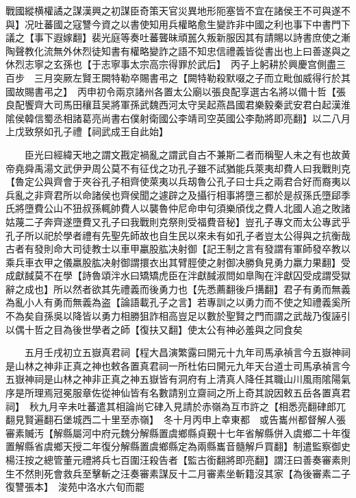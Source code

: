戰國縱横權譎之謀漢興之初謀臣奇策天官災異地形阨塞皆不宜在諸侯王不可與遂不與】况吐蕃國之寇讐今資之以書使知用兵權略愈生變詐非中國之利也事下中書門下議之【事下遐嫁翻】裴光庭等奏吐蕃聾昧頑嚚久叛新服因其有請賜以詩書庶使之漸陶聲教化流無外休烈徒知書有權略變詐之語不知忠信禮義皆從書出也上曰善遂與之休烈志寧之玄孫也【于志寧事太宗高宗得罪於武后】　丙子上躬耕於興慶宫側盡三百步　三月突厥左賢王闕特勒卒賜書弔之【闕特勒殺默啜之子而立毗伽威得行於其國故賜書弔之】　丙申初令兩京諸州各置太公廟以張良配享選古名將以備十哲【張良配饗齊大司馬田穰苴吴將軍孫武魏西河太守吴起燕昌國君樂毅秦武安君白起漢淮隂侯韓信蜀丞相諸葛亮尚書右僕射衛國公李靖司空英國公李勣將即亮翻】以二八月上戊致祭如孔子禮【祠武成王自此始】

　　臣光曰經緯天地之謂文戡定禍亂之謂武自古不兼斯二者而稱聖人未之有也故黄帝堯舜禹湯文武伊尹周公莫不有征伐之功孔子雖不試猶能兵萊夷却費人曰我戰則克【魯定公與齊會于夾谷孔子相齊使萊夷以兵刼魯公孔子曰士兵之兩君合好而裔夷以兵亂之非齊君所以命諸侯也齊侯聞之遽辟之及攝行相事將墮三都於是叔孫氏墮郈季氏將墮費公山不狃叔孫輒帥費人以襲魯仲尼命申句須樂頎伐之費人北國人追之敗諸姑蔑二子奔齊遂墮費又孔子曰我戰則克祭則受福費音秘】豈孔子專文而太公專武乎孔子所以祀於學者禮有先聖先師故也自生民以來未有如孔子者豈太公得與之抗衡哉古者有發則命大司徒教士以車甲臝股肱决射御【記王制之言有發謂有軍師發卒教以乘兵車衣甲之儀羸股肱决射御謂擐衣出其臂脛使之射御决勝負見勇力羸力果翻】受成獻馘莫不在學【詩魯頌泮水曰矯矯虎臣在泮獻馘淑問如臯陶在泮獻囚受成謂受獄辭之成也】所以然者欲其先禮義而後勇力也【先悉薦翻後戶搆翻】君子有勇而無義為亂小人有勇而無義為盗【論語載孔子之言】若專訓之以勇力而不使之知禮義奚所不為矣自孫吳以降皆以勇力相勝狙詐相高豈足以數於聖賢之門而謂之武哉乃復誣引以偶十哲之目為後世學者之師【復扶又翻】使太公有神必羞與之同食矣

　　五月壬戌初立五嶽真君祠【程大昌演繁露曰開元十九年司馬承禎言今五嶽神祠是山林之神非正真之神也敕各置真君祠一所杜佑曰開元九年天台道士司馬承禎言今五嶽神祠是山林之神非正真之神五嶽皆有洞府有上清真人降任其職山川風雨隂陽氣序是所理焉冠冕服章佐從神仙皆有名數請别立齋祠之所上奇其說因敕五岳各置真君祠】　秋九月辛未吐蕃遣其相論尚它硉入見請於赤嶺為互市許之【相悉亮翻硉郎兀翻見賢遍翻石堡城西二十里至赤嶺】　冬十月丙申上幸東都　或告巂州都督解人張審素贓汚【解縣屬河中府元魏分解縣置虞鄉縣貞覲十七年省解縣併入虞鄉二十年復置解縣省虞鄉天授二年復分解縣置虞鄉縣定為兩縣巂音髓解戶買翻】制遣監察御史楊汪按之總管董元禮將兵七百圍汪殺告者【監古銜翻將即亮翻】謂汪曰善奏審素則生不然則死會救兵至擊斬之汪奏審素謀反十二月審素坐斬籍沒其家【為後審素二子復讐張本】　浚苑中洛水六旬而罷


